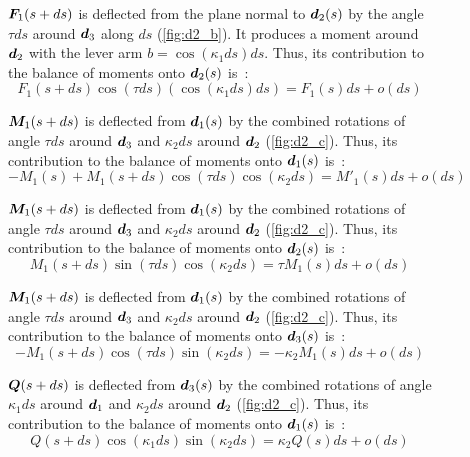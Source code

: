 \begin{figure}[p]
\begin{fullpage}
		$\boldsymbol{F}_1(s+ds)$ is deflected from the plane normal to $\boldsymbol{d}_2(s)$ by the angle $\tau ds$ around $\boldsymbol{d}_3$ along $ds$ (\cref{fig:d2_b}). It produces a moment around $\boldsymbol{d}_2$ with the lever arm $b =  \cos(\kappa_1 ds) ds$. Thus, its contribution to the balance of moments onto $\boldsymbol{d}_2(s)$ is~: 
	\begin{equation*}
		F_1(s+ds) \cos(\tau ds) (\cos(\kappa_1 ds) ds) = F_1(s) ds + o(ds)
	\end{equation*}
	
	$\boldsymbol{M}_1(s+ds)$ is deflected from $\boldsymbol{d}_1(s)$ by the combined rotations of angle $\tau ds$ around $\boldsymbol{d}_3$ and $\kappa_2 ds$ around $\boldsymbol{d}_2$ (\cref{fig:d2_c}). Thus, its contribution to the balance of moments onto $\boldsymbol{d}_1(s)$ is~: 
	\begin{equation*}
		-M_1(s) + M_1(s+ds) \cos(\tau ds) \cos(\kappa_2 ds) = M'_1 (s) ds + o(ds)
	\end{equation*}	
	
	$\boldsymbol{M}_1(s+ds)$ is deflected from $\boldsymbol{d}_1(s)$ by the combined rotations of angle $\tau ds$ around $\boldsymbol{d}_3$ and $\kappa_2 ds$ around $\boldsymbol{d}_2$ (\cref{fig:d2_c}). Thus, its contribution to the balance of moments onto $\boldsymbol{d}_2(s)$ is~: 
	\begin{equation*}
		M_1(s+ds) \sin(\tau ds) \cos(\kappa_2 ds) = \tau M_1 (s) ds + o(ds)
	\end{equation*}	
	
	$\boldsymbol{M}_1(s+ds)$ is deflected from $\boldsymbol{d}_1(s)$ by the combined rotations of angle $\tau ds$ around $\boldsymbol{d}_3$ and $\kappa_2 ds$ around $\boldsymbol{d}_2$ (\cref{fig:d2_c}). Thus, its contribution to the balance of moments onto $\boldsymbol{d}_3(s)$ is~: 
	\begin{equation*}
		-M_1(s+ds) \cos(\tau ds) \sin(\kappa_2 ds) = -\kappa_2 M_1 (s) ds + o(ds)
	\end{equation*}	
	
	$\boldsymbol{Q}(s+ds)$ is deflected from $\boldsymbol{d}_3(s)$ by the combined rotations of angle $\kappa_1 ds$ around $\boldsymbol{d}_1$ and $\kappa_2 ds$ around $\boldsymbol{d}_2$ (\cref{fig:d2_c}). Thus, its contribution to the balance of moments onto $\boldsymbol{d}_1(s)$ is~: 
	\begin{equation*}
		Q(s+ds) \cos(\kappa_1 ds) \sin(\kappa_2 ds) = \kappa_2 Q(s) ds + o(ds)
	\end{equation*}	
	  \end{fullpage}
\end{figure}

\clearpage
